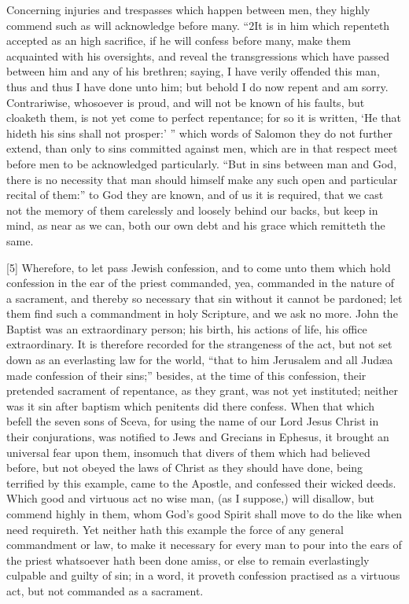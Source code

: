 Concerning injuries and trespasses which happen between men, they highly commend such as will acknowledge before many. “2It is in him which repenteth accepted as an high sacrifice, if he will confess before many, make them acquainted with his oversights, and reveal the transgressions which have passed between him and any of his brethren; saying, I have verily offended this man, thus and thus I have done unto him; but behold I do now repent and am sorry. Contrariwise, whosoever is proud, and will not be known of his faults, but cloaketh them, is not yet come to perfect repentance; for so it is written, ‘He that hideth his sins shall not prosper:’ ” which words of Salomon they do not further extend, than only to sins committed against men, which are in that respect meet before men to be acknowledged particularly. “But in sins between man and God, there is no necessity that man should himself make any such open and particular recital of them:” to God they are known, and of us it is required, that we cast not the memory of them carelessly and loosely behind our backs, but keep in mind, as near as we can, both our own debt and his grace which remitteth the same.

[5] Wherefore, to let pass Jewish confession, and to come unto them which hold confession in the ear of the priest commanded, yea, commanded in the nature of a sacrament, and thereby so necessary that sin without it cannot be pardoned; let them find such a commandment in holy Scripture, and we ask no more. John the Baptist was an extraordinary person; his birth, his actions of life, his office extraordinary. It is therefore recorded for the strangeness of the act, but not set down as an everlasting law for the world, “that to him Jerusalem and all Judæa made confession of their sins;” besides, at the time of this confession, their pretended sacrament of repentance, as they grant, was not yet instituted; neither was it sin after baptism which penitents did there confess. When that which befell the seven sons of Sceva, for using the name of our Lord Jesus Christ in their conjurations, was notified to Jews and Grecians in Ephesus, it brought an universal fear upon them, insomuch that divers of them which had believed before, but not obeyed the laws of Christ as they should have done, being terrified by this example, came to the Apostle, and confessed their wicked deeds. Which good and virtuous act no wise man, (as I suppose,) will disallow, but commend highly in them, whom God’s good Spirit shall move to do the like when need requireth. Yet neither hath this example the force of any general commandment or law, to make it necessary for every man to pour into the ears of the priest whatsoever hath been done amiss, or else to remain everlastingly culpable and guilty of sin; in a word, it proveth confession practised as a virtuous act, but not commanded as a sacrament.

